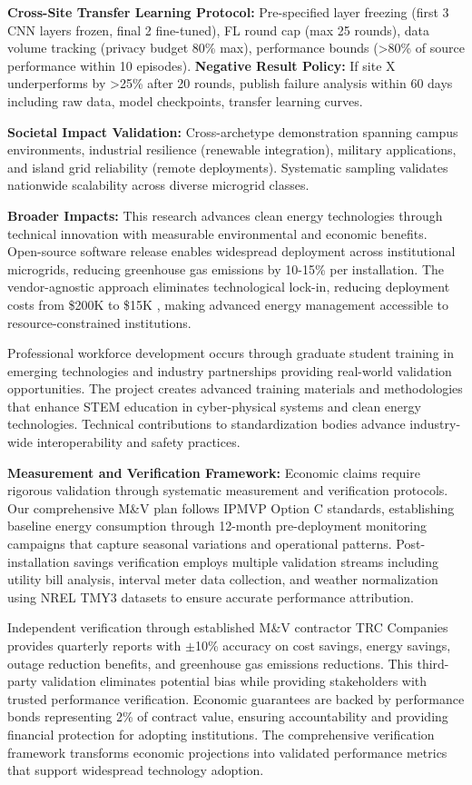 \documentclass[12pt]{article}
\begin{document}
\textbf{Cross-Site Transfer Learning Protocol:} Pre-specified layer freezing (first 3 CNN layers frozen, final 2 fine-tuned), FL round cap (max 25 rounds), data volume tracking (privacy budget 80\% max), performance bounds (>80\% of source performance within 10 episodes). \textbf{Negative Result Policy:} If site X underperforms by >25\% after 20 rounds, publish failure analysis within 60 days including raw data, model checkpoints, transfer learning curves.

\textbf{Societal Impact Validation:} Cross-archetype demonstration spanning campus environments, industrial resilience (renewable integration), military applications, and island grid reliability (remote deployments). Systematic sampling validates nationwide scalability across diverse microgrid classes.

\textbf{Broader Impacts:} This research advances clean energy technologies through technical innovation with measurable environmental and economic benefits. Open-source software release enables widespread deployment across institutional microgrids, reducing greenhouse gas emissions by 10-15\% per installation. The vendor-agnostic approach eliminates technological lock-in, reducing deployment costs from \$200K to \$15K \cite{our2024economic}, making advanced energy management accessible to resource-constrained institutions.

Professional workforce development occurs through graduate student training in emerging technologies and industry partnerships providing real-world validation opportunities. The project creates advanced training materials and methodologies that enhance STEM education in cyber-physical systems and clean energy technologies. Technical contributions to standardization bodies advance industry-wide interoperability and safety practices.


\textbf{Measurement and Verification Framework:} Economic claims require rigorous validation through systematic measurement and verification protocols. Our comprehensive M\&V plan follows IPMVP Option C standards, establishing baseline energy consumption through 12-month pre-deployment monitoring campaigns that capture seasonal variations and operational patterns. Post-installation savings verification employs multiple validation streams including utility bill analysis, interval meter data collection, and weather normalization using NREL TMY3 datasets to ensure accurate performance attribution.

Independent verification through established M\&V contractor TRC Companies provides quarterly reports with $\pm$10\% accuracy on cost savings, energy savings, outage reduction benefits, and greenhouse gas emissions reductions. This third-party validation eliminates potential bias while providing stakeholders with trusted performance verification. Economic guarantees are backed by performance bonds representing 2\% of contract value, ensuring accountability and providing financial protection for adopting institutions. The comprehensive verification framework transforms economic projections into validated performance metrics that support widespread technology adoption.
\end{document}
